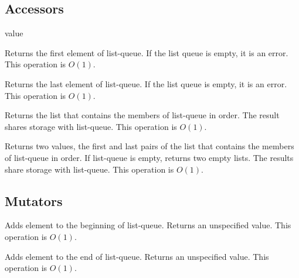 \subsection{Accessors}\label{Accessors}

\begin{entry}{%
  value}

  Returns the first element of list-queue. If the list queue is empty,
  it is an error. This operation is $O(1)$.
\end{entry}

\begin{entry}{%
  }

  Returns the last element of list-queue. If the list queue is empty,
  it is an error. This operation is $O(1)$.
\end{entry}

\begin{entry}{%
  }

  Returns the list that contains the members of list-queue in
  order. The result shares storage with list-queue. This operation is
  $O(1)$.
\end{entry}

\begin{entry}{%
  }

  Returns two values, the first and last pairs of the list that
  contains the members of list-queue in order. If list-queue is empty,
  returns two empty lists. The results share storage with
  list-queue. This operation is $O(1)$.
\end{entry}

\subsection{Mutators}\label{Mutators}

\begin{entry}{%
  }

  Adds element to the beginning of list-queue. Returns an unspecified
  value. This operation is $O(1)$.
\end{entry}

\begin{entry}{%
  }

  Adds element to the end of list-queue. Returns an unspecified value.
  This operation is $O(1)$.
\end{entry}

